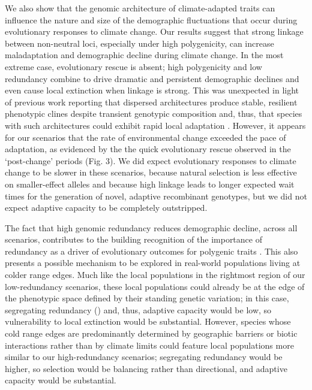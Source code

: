 \documentclass[9pt,twocolumn,twoside,lineno]{new_article}
\begin{document}
We also show that the genomic architecture of climate-adapted traits
can influence the nature and size of the demographic fluctuations
that occur during evolutionary responses to climate change.
Our results suggest that strong linkage between non-neutral loci,
especially under high polygenicity, can increase maladaptation and demographic decline
during climate change. 
In the most extreme case, evolutionary rescue is absent;
high polygenicity and low redundancy
combine to drive dramatic and persistent demographic declines
and even cause local extinction when linkage is strong.
This was unexpected in light of previous work reporting
that dispersed architectures produce stable,
resilient phenotypic clines despite transient genotypic composition \cite{yeaman_amnat,yeaman_review}
and, thus, that species with such architectures
could exhibit rapid local adaptation \cite{aitken_yeaman}. However, it appears for our scenarios that the rate of environmental change exceeded the pace of
adaptation, as evidenced by the the quick evolutionary
rescue observed in the  
`post-change' periods (Fig. 3). 
We did expect evolutionary responses to climate change
to be slower in these scenarios,
because natural selection is less effective on smaller-effect alleles
and because high linkage leads to longer expected wait times for the generation
of novel, adaptive recombinant genotypes, but we did not expect
adaptive capacity to be completely outstripped.

The fact that high genomic redundancy reduces demographic decline,
across all scenarios, contributes to the building recognition of the importance of redundancy
as a driver of evolutionary outcomes for polygenic traits
\cite{laruson,yeaman_review}.
This also presents a possible mechanism to be explored
in real-world populations living at colder range edges.
Much like the local populations in the rightmost region of our low-redundancy scenarios,
these local populations could already be at the edge of the phenotypic space defined by
their standing genetic variation;
in this case, 
segregating redundancy (\cite{laruson}) and, thus,
adaptive capacity would be low,
so vulnerability to local extinction would be substantial.
However, species whose cold range edges are predominantly determined by geographic barriers
or biotic interactions rather than by climate limits \cite{thomas}
could feature local populations more similar to our high-redundancy scenarios;
segregating redundancy would be higher,
so selection would be balancing rather than directional, and adaptive capacity would be substantial.
\end{document}
